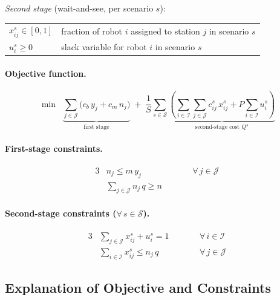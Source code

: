 \documentclass[11pt,a4paper]{article}
\begin{document}
\medskip
\noindent\textit{Second stage} (wait-and-see, per scenario $s$):
\begin{tabular}{@{}ll@{}}
$x_{ij}^s \in [0,1]$  & fraction of robot $i$ assigned to station $j$ in scenario $s$ \\
$u_i^s \geq 0$        & slack variable for robot $i$ in scenario $s$
\end{tabular}

\medskip
\paragraph{Objective function.}
\begin{equation}\label{eq:q2-obj}
  \min \;\;
  \underbrace{\sum_{j \in \mathcal{J}} \bigl(c_b \, y_j + c_m \, n_j\bigr)}_{\text{first stage}}
  \;+\;
  \frac{1}{S} \sum_{s \in \mathcal{S}}
  \underbrace{\left(\sum_{i \in \mathcal{I}} \sum_{j \in \mathcal{J}} c_{ij}^s \, x_{ij}^s + P \sum_{i \in \mathcal{I}} u_i^s\right)}_{\text{second-stage cost } Q^s}
\end{equation}

\medskip
\paragraph{First-stage constraints.}
\begin{alignat}{3}
  & n_j \leq m \, y_j
    && \qquad \forall\, j \in \mathcal{J}
    \label{eq:s1} \tag{S1} \\[4pt]
  & \sum_{j \in \mathcal{J}} n_j \, q \geq n
    && \label{eq:s2} \tag{S2}
\end{alignat}

\paragraph{Second-stage constraints ($\forall\, s \in \mathcal{S}$).}
\begin{alignat}{3}
  & \sum_{j \in \mathcal{J}} x_{ij}^s + u_i^s = 1
    && \qquad \forall\, i \in \mathcal{I}
    \label{eq:s3} \tag{S3} \\[4pt]
  & \sum_{i \in \mathcal{I}} x_{ij}^s \leq n_j \, q
    && \qquad \forall\, j \in \mathcal{J}
    \label{eq:s4} \tag{S4}
\end{alignat}

\subsection{Explanation of Objective and Constraints}
\end{document}
